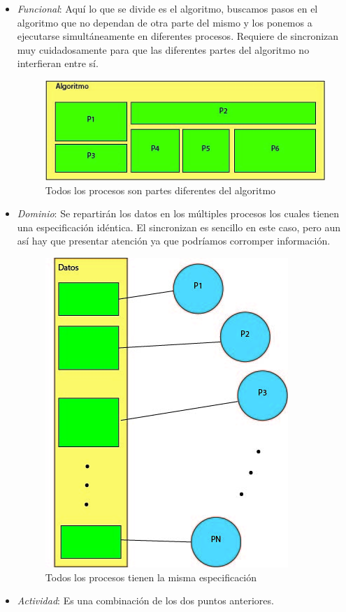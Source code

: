 \begin{itemize}
 
	\item \textit{Funcional}: Aquí lo que se divide es el algoritmo, buscamos pasos en el algoritmo que no dependan de otra parte del mismo y los ponemos a ejecutarse simultáneamente en diferentes procesos. Requiere de sincronizan muy cuidadosamente para que las diferentes partes del algoritmo no interfieran entre sí. 
	
	\begin{figure}[h]
			\centering
				\includegraphics[scale=0.7]{img/funcional.jpg}
			\caption{Todos los procesos son partes diferentes del algoritmo}
	\end{figure}

	\item \textit{Dominio}: Se repartirán los datos en los múltiples procesos los cuales tienen una especificación idéntica. El sincronizan es sencillo en este caso, pero aun así hay que presentar atención ya que podríamos corromper información.
	\begin{figure}[h]
			\centering
				\includegraphics[scale=0.6]{img/dominio.jpg}
			\caption{Todos los procesos tienen la misma especificación}
	\end{figure}

	\item 	\textit{Actividad}: Es una combinación de los dos puntos anteriores.
\end{itemize}

